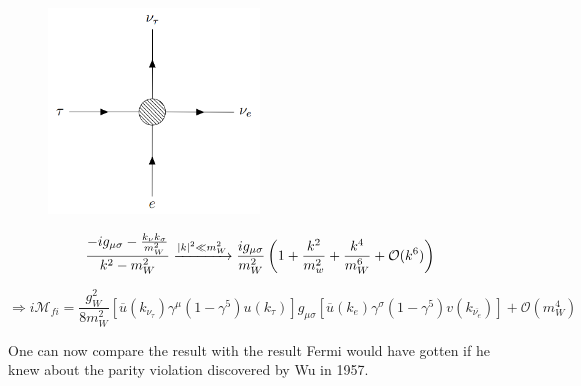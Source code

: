 \documentclass[../Bachelorarbeit.tex]{subfiles}
\begin{document}
\begin{figure}[h]
    \centering
    \includegraphics[width=0.5\textwidth]{images/propagator_collaps.PNG}
\end{figure}
\begin{equation}
    \frac{-ig_{\mu\sigma}-\frac{k_{\nu}k_{\sigma}}{m_{W}^{2}}}{k^{2}-m_{W}^{2}} \xrightarrow{\abs{k}^{2} \ll m_{W}^{2}} \frac{ig_{\mu\sigma}}{m_{W}^{2}} \left( 1 + \frac{k^{2}}{m_{w}^{2}}+\frac{k^{4}}{m_{W}^{6}}+\mathcal{O}(k^6) \right)
    \label{eq:Fermi_propergator}
\end{equation}

\begin{equation}
    \Rightarrow i\mathcal{M}_{fi}=\frac{g_{W}^{2}}{8 m_{W}^{2}} \left[ \overline{u}(k_{\nu_{\tau}})\gamma^{\mu}(1-\gamma^{5})u(k_{\tau}) \right] g_{\mu\sigma} \left[ \overline{u}(k_{e})\gamma^{\sigma}(1-\gamma^{5})v(k_{\overline{\nu_{e}}}) \right] + \mathcal{O}(m_{W}^{4})
    \label{eq:Fermi_colapse}
\end{equation}

One can now compare the result with the result Fermi would have gotten if he knew about the parity violation discovered by Wu in 1957.
\end{document}
